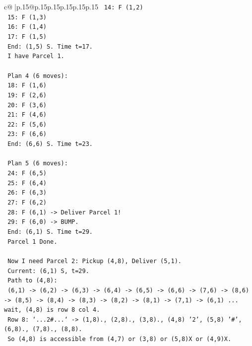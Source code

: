 \documentclass{article}
\begin{document}
{\begin{supertabular}{c@{$\;$}|p{.15\linewidth}@{}p{.15\linewidth}p{.15\linewidth}p{.15\linewidth}p{.15\linewidth}p{.15\linewidth}}
{{{\texttt{      14: F (1,2)} \\
\texttt{      15: F (1,3)} \\
\texttt{      16: F (1,4)} \\
\texttt{      17: F (1,5)} \\
\texttt{      End: (1,5) S. Time t=17.} \\
\texttt{      I have Parcel 1.} \\
\\ 
\texttt{      Plan 4 (6 moves):} \\
\texttt{      18: F (1,6)} \\
\texttt{      19: F (2,6)} \\
\texttt{      20: F (3,6)} \\
\texttt{      21: F (4,6)} \\
\texttt{      22: F (5,6)} \\
\texttt{      23: F (6,6)} \\
\texttt{      End: (6,6) S. Time t=23.} \\
\\ 
\texttt{      Plan 5 (6 moves):} \\
\texttt{      24: F (6,5)} \\
\texttt{      25: F (6,4)} \\
\texttt{      26: F (6,3)} \\
\texttt{      27: F (6,2)} \\
\texttt{      28: F (6,1) {-}> Deliver Parcel 1!} \\
\texttt{      29: F (6,0) {-}> BUMP.} \\
\texttt{      End: (6,1) S. Time t=29.} \\
\texttt{      Parcel 1 Done.} \\
\\ 
\texttt{      Now I need Parcel 2: Pickup (4,8), Deliver (5,1).} \\
\texttt{      Current: (6,1) S, t=29.} \\
\texttt{      Path to (4,8):} \\
\texttt{      (6,1) {-}> (6,2) {-}> (6,3) {-}> (6,4) {-}> (6,5) {-}> (6,6) {-}> (7,6) {-}> (8,6) {-}> (8,5) {-}> (8,4) {-}> (8,3) {-}> (8,2) {-}> (8,1) {-}> (7,1) {-}> (6,1) ... wait, (4,8) is row 8 col 4.} \\
\texttt{      Row 8: `...2\#...` {-}> (1,8)., (2,8)., (3,8)., (4,8) '2', (5,8) '\#', (6,8)., (7,8)., (8,8).} \\
\texttt{      So (4,8) is accessible from (4,7) or (3,8) or (5,8)X or (4,9)X.} \\
}}}
\end{supertabular}}
\end{document}
